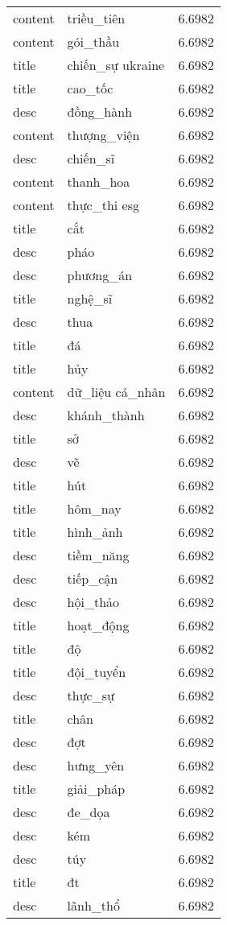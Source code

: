 \documentclass{article}
\begin{document}
\begin{tabular}{lll}
content & triều\_tiên & 6.6982\\
content & gói\_thầu & 6.6982\\
title & chiến\_sự ukraine & 6.6982\\
title & cao\_tốc & 6.6982\\
desc & đồng\_hành & 6.6982\\
content & thượng\_viện & 6.6982\\
desc & chiến\_sĩ & 6.6982\\
content & thanh\_hoa & 6.6982\\
content & thực\_thi esg & 6.6982\\
title & cắt & 6.6982\\
desc & pháo & 6.6982\\
desc & phương\_án & 6.6982\\
title & nghệ\_sĩ & 6.6982\\
desc & thua & 6.6982\\
title & đá & 6.6982\\
title & hủy & 6.6982\\
content & dữ\_liệu cá\_nhân & 6.6982\\
desc & khánh\_thành & 6.6982\\
title & sở & 6.6982\\
desc & vẽ & 6.6982\\
title & hút & 6.6982\\
title & hôm\_nay & 6.6982\\
title & hình\_ảnh & 6.6982\\
desc & tiềm\_năng & 6.6982\\
desc & tiếp\_cận & 6.6982\\
desc & hội\_thảo & 6.6982\\
title & hoạt\_động & 6.6982\\
title & độ & 6.6982\\
title & đội\_tuyển & 6.6982\\
desc & thực\_sự & 6.6982\\
title & chân & 6.6982\\
desc & đợt & 6.6982\\
desc & hưng\_yên & 6.6982\\
title & giải\_pháp & 6.6982\\
desc & đe\_dọa & 6.6982\\
desc & kém & 6.6982\\
desc & túy & 6.6982\\
title & đt & 6.6982\\
desc & lãnh\_thổ & 6.6982\\

\end{tabular}
\end{document}
